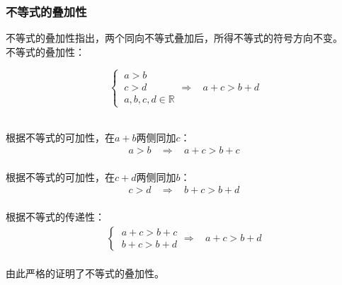 \documentclass[UTF8]{ctexart}
\begin{document}
\subsubsection{不等式的叠加性}
    \setcounter{equation}{0}
    不等式的叠加性指出，两个同向不等式叠加后，所得不等式的符号方向不变。\\[3mm]
    不等式的叠加性：
    \begin{large}
        \begin{equation*}
            \begin{cases}
                ~a>b\\[3mm]
                ~c>d\\[3mm]
                ~a,b,c,d\in\mathbb{R}
            \end{cases}
            \Longrightarrow~~~~a+c>b+d
        \end{equation*}
    \end{large}\\[3mm]
    根据不等式的可加性，在$a+b$两侧同加$c$：
    \begin{align}
        a>b~~~~\Longrightarrow~~~~a+c>b+c
    \end{align}\\
    根据不等式的可加性，在$c+d$两侧同加$b$：
    \begin{align}
        c>d~~~~\Longrightarrow~~~~b+c>b+d
    \end{align}\\
    根据不等式的传递性：
    \begin{align}
        \begin{cases}
            ~a+c>b+c\\[4mm]
            ~b+c>b+d
        \end{cases}\Longrightarrow~~~~
        a+c>b+d
    \end{align}\\
    由此严格的证明了不等式的叠加性。

\newpage
\end{document}
